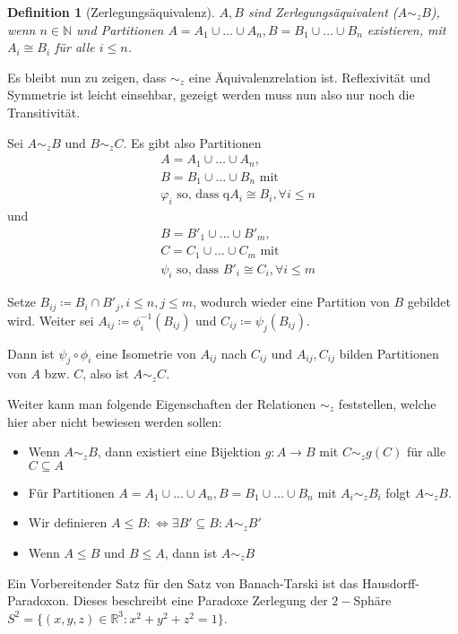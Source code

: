\documentclass[german]{article}
\theoremstyle{break}
\theoremstyle{def_style}
\newtheorem{definition}{Definition}[section]
\theoremstyle{def_style}
\theoremstyle{lemma_style}
\begin{document}
\begin{definition}[Zerlegungsäquivalenz]
	$A, B$ sind \textit{Zerlegungsäquivalent} ($A\sim_z B$), wenn $n\in\mathbb{N}$ und Partitionen $A=A_1\cup\dots\cup A_n, B=B_1\cup\dots\cup B_n$ existieren, mit $A_i\cong B_i$ für alle $i\leq n$.
\end{definition}

Es bleibt nun zu zeigen, dass $\sim_z$ eine Äquivalenzrelation ist. Reflexivität und Symmetrie ist leicht einsehbar, gezeigt werden muss nun also nur noch die Transitivität.

Sei $A\sim_z B$ und $B\sim_z C$. Es gibt also Partitionen 
\begin{align*}
	&A=A_1\cup\dots\cup A_n,\\
	&B=B_1\cup\dots\cup B_n \text{ mit}\\
	&\varphi_i \text{ so, dass q} A_i\cong B_i, \forall i\leq n
\end{align*}
und 
\begin{align*}
	&B=B'_1\cup\dots\cup B'_m,\\
	&C=C_1\cup\dots\cup C_m \text{ mit}\\
	&\psi_i \text{ so, dass } B'_i\cong C_i, \forall i\leq m
\end{align*}

Setze $B_{ij}\coloneqq B_i\cap B'_j, i\leq n, j\leq m$, wodurch wieder eine Partition von $B$ gebildet wird. Weiter sei $A_{ij}\coloneqq\phi_i^{-1}(B_{ij})$ und $C_{ij}\coloneqq\psi_j(B_{ij})$.

Dann ist $\psi_j\circ\phi_i$ eine Isometrie von $A_{ij}$ nach $C_{ij}$ und $A_{ij}, C_{ij}$ bilden Partitionen von $A$ bzw. $C$, also ist $A\sim_z C$.

Weiter kann man folgende Eigenschaften der Relationen $\sim_z$ feststellen, welche hier aber nicht bewiesen werden sollen:
\begin{itemize}
	\item Wenn $A\sim_z B$, dann existiert eine Bijektion $g:A\to B$ mit $C\sim_z g(C)$ für alle $C\subseteq A$
	\item Für Partitionen $A=A_1\cup\dots\cup A_n, B=B_1\cup\dots\cup B_n$ mit $A_i\sim_z B_i$ folgt $A\sim_z B$.
	\item Wir definieren $A\leq B\colon\Leftrightarrow \exists B'\subseteq B : A\sim_z B'$
	\item Wenn $A\leq B$ und $B\leq A$, dann ist $A\sim_z B$
\end{itemize}

Ein Vorbereitender Satz für den Satz von Banach-Tarski ist das Hausdorff-Paradoxon. Dieses beschreibt eine Paradoxe Zerlegung der $2-$Sphäre $S^2=\{(x,y,z)\in\mathbb{R}^3 : x^2+y^2+z^2=1\}$.
\end{document}

